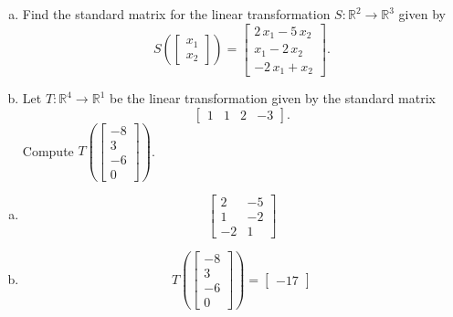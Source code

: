 
\begin{exerciseStatement}

\begin{enumerate}[(a)]
\item Find the standard matrix for the linear transformation \(S:\mathbb{R}^ 2  \to \mathbb{R}^ 3 \) given by \[S\left(  \left[\begin{array}{c}
x_{1} \\
x_{2}
\end{array}\right]  \right) =  \left[\begin{array}{c}
2 \, x_{1} - 5 \, x_{2} \\
x_{1} - 2 \, x_{2} \\
-2 \, x_{1} + x_{2}
\end{array}\right] .\]
\item Let \(T:\mathbb{R}^ 4  \to \mathbb{R}^ 1 \) be the linear transformation given by the standard matrix \[ \left[\begin{array}{cccc}
1 & 1 & 2 & -3
\end{array}\right] .\] Compute \(T\left( \left[\begin{array}{c}
-8 \\
3 \\
-6 \\
0
\end{array}\right]  \right)\). 
\end{enumerate}
    
\end{exerciseStatement}
    
\begin{exerciseAnswer} 

\begin{enumerate}[(a)]
\item \[ \left[\begin{array}{cc}
2 & -5 \\
1 & -2 \\
-2 & 1
\end{array}\right] \]
\item \[T\left( \left[\begin{array}{c}
-8 \\
3 \\
-6 \\
0
\end{array}\right]  \right)= \left[\begin{array}{c}
-17
\end{array}\right] \]
\end{enumerate}
    
\end{exerciseAnswer}
    
